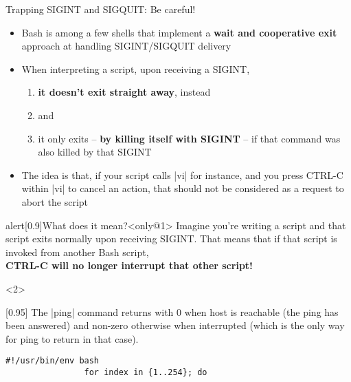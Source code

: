 \begin{frame}[fragile]{Trapping SIGINT and SIGQUIT: Be careful!}
    \vspace{-1mm}
    \begin{overlayarea}{\textwidth}{0.7\textheight}
        \begin{itemize}
            \item Bash is among a few shells that implement a \textbf{wait and cooperative exit} approach at handling SIGINT/SIGQUIT delivery
            \item When interpreting a script, upon receiving a SIGINT,
            \begin{enumerate}
                \item \textbf{it doesn't exit straight away}, instead
                \item {} and
                \item \alert{it only exits -- \textbf{by killing itself with SIGINT} -- if that command was also killed by that SIGINT}
            \end{enumerate}
            \item<only@1> The idea is that, if your script calls \bash|vi| for instance, and you press CTRL-C within \bash|vi| to cancel an action, that should not be considered as a request to abort the script
        \end{itemize}
        \begin{varblock}{alert}[0.9\textwidth]{What does it mean?}<only@1>
            Imagine you're writing a script and that script exits normally upon receiving SIGINT.
            That means that if that script is invoked from another Bash script, \\\alert{\textbf{CTRL-C will no longer interrupt that other script!}}
        \end{varblock}
        \begin{onlyenv}<2>
            \begin{varblock}{}[0.95\textwidth]{}
                \small The \bash|ping| command returns with 0 when host is reachable (the ping has been answered) and non-zero otherwise when interrupted (which is the only way for ping to return in that case).
            \end{varblock}
            \begin{lstlisting}[style=MyBash, aboveskip=0mm, belowskip=-6mm]
                #!/usr/bin/env bash
                for index in {1..254}; do

\end{lstlisting}
\end{onlyenv}
\end{overlayarea}
\end{frame}
